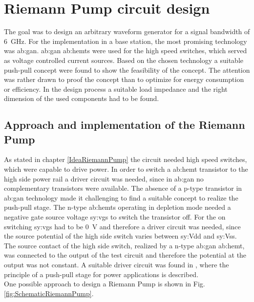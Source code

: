 \chapter{Riemann Pump circuit design}
\label{ch:design}
The goal was to design an arbitrary waveform generator for a signal bandwidth of \SI{6}{\giga \hertz}.
For the implementation in a base station, the most promising technology was \gls{ab:gan}.
\gls{ab:gan} \glspl{ab:hemt} were used for the high speed switches, which served as voltage controlled current sources.
Based on the chosen technology a suitable push-pull concept were found \cite{MaksimovicPaper} to show the feasibility of the concept.
The attention was rather drawn to proof the concept than to optimize for energy consumption or efficiency.
In the design process a suitable load impedance and the right dimension of the used components had to be found.

\section{Approach and implementation of the Riemann Pump}
As stated in chapter \ref{IdeaRiemannPump} the circuit needed high speed switches, which were capable to drive power.
In order to switch a \gls{ab:hemt} transistor to the high side power rail a driver circuit was needed, since in \gls{ab:gan} no complementary transistors were available.
The absence of a p-type transistor in \gls{ab:gan} technology made it challenging to find a suitable concept to realize the push-pull stage.
The n-type \glspl{ab:hemt} operating in depletion mode needed a negative gate source voltage \gls{sy:vgs} to switch the transistor off.
For the on switching \gls{sy:vgs} had to be \SI{0}{\volt} and therefore a driver circuit was needed, since the source potential of the high side switch varies between \gls{sy:Vdd} and \gls{sy:Vss}.
The source contact of the high side switch, realized by a n-type \gls{ab:gan} \gls{ab:hemt}, was connected to the output of the test circuit and therefore the potential at the output was not constant.
A suitable driver circuit was found in \cite{MaksimovicPaper}, where the principle of a push-pull stage for power applications is described.\\
One possible approach to design a Riemann Pump is shown in Fig. \ref{fig:SchematicRiemannPump}.

